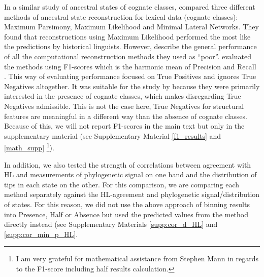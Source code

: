 \documentclass[12pt,letterpaper]{article}
\begin{document}
In a similar study of ancestral states of cognate classes, \citet{jager2018using} compared three different methods of ancestral state reconstruction for lexical data (cognate classes): Maximum Parsimony, Maximum Likelihood and Minimal Lateral Networks. They found that reconstructions using Maximum Likelihood performed the most like the predictions by historical linguists. However, \citet{jager2018using} describe the general performance of all the computational reconstruction methods they used as ``poor''. \citet{jager2018using} evaluated the methods using F1-scores which is the harmonic mean of Precision and Recall \citep{sasaki2007truth}. This way of evaluating performance focused on True Positives and ignores True Negatives altogether. It was suitable for the study by \citet{jager2018using} because they were primarily interested in the presence of cognate classes, which makes disregarding True Negatives admissible. This is not the case here, True Negatives for structural features are meaningful in a different way than the absence of cognate classes. Because of this, we will not report F1-scores in the main text but only in the supplementary material (see Supplementary Material \ref{f1_results} and \ref{math_supp} \footnote{I am very grateful for mathematical assistance from Stephen Mann in regards to the F1-score including half results calculation.}). %

 
In addition, we also tested the strength of correlations between agreement with HL and measurements of phylogenetic signal on one hand and the distribution of tips in each state on the other. For this comparison, we are comparing each method separately against the HL-agreement and phylogenetic signal/distribution of states. For this reason, we did not use the above approach of binning results into Presence, Half or Absence but used the predicted values from the method directly instead (see Supplementary Materials \ref{supp:cor_d_HL} and \ref{supp:cor_min_p_HL}.

\end{document}
